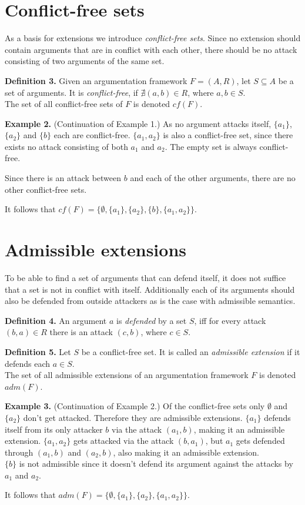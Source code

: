 \documentclass[draft,final]{vutinfth} %
\newcommand{\hl}{\par\vspace{6pt}} %
\newcommand{\cl}{\par\vspace{12pt}} %
\begin{document}
\section{Conflict-free sets}

As a basis for extensions we introduce \emph{conflict-free sets}. Since no extension should contain arguments that are in conflict with each other, there should be no attack consisting of two arguments of the same set.\cl

\textbf{Definition 3.} Given an argumentation framework $F=(A,R)$, let $S\subseteq A$ be a set of arguments. It is \emph{conflict-free}, if $\nexists (a,b)\in R$, where $a,b\in S$.\\
The set of all conflict-free sets of $F$ is denoted $cf(F)$.\cl

\textbf{Example 2.} (Continuation of Example 1.) As no argument attacks itself, $\{a_1\}$, $\{a_2\}$ and $\{b\}$ each are conflict-free. $\{a_1,a_2\}$ is also a conflict-free set, since there exists no attack consisting of both $a_1$ and $a_2$. The empty set is always conflict-free.\hl
Since there is an attack between $b$ and each of the other arguments, there are no other conflict-free sets.\hl
It follows that $cf(F)=\{\emptyset,\{a_1\},\{a_2\},\{b\},\{a_1,a_2\}\}$.\cl

\section{Admissible extensions}

To be able to find a set of arguments that can defend itself, it does not suffice that a set is not in conflict with itself. Additionally each of its arguments should also be defended from outside attackers as is the case with admissible semantics.\hl

\textbf{Definition 4.} An argument $a$ is \emph{defended} by a set $S$, iff for every attack $(b,a)\in R$ there is an attack $(c,b)$, where $c\in S$.\cl

\textbf{Definition 5.} Let $S$ be a conflict-free set. It is called an \emph{admissible extension} if it defends each $a\in S$.\\
The set of all admissible extensions of an argumentation framework $F$ is denoted $adm(F)$.\cl

\textbf{Example 3.} (Continuation of Example 2.) Of the conflict-free sets only \(\emptyset\) and $\{a_2\}$ don't get attacked. Therefore they are admissible extensions. $\{a_1\}$ defends itself from its only attacker $b$ via the attack $(a_1,b)$, making it an admissible extension. $\{a_1,a_2\}$ gets attacked via the attack $(b,a_1)$, but $a_1$ gets defended through $(a_1,b)$ and $(a_2,b)$, also making it an admissible extension.\\
$\{b\}$ is not admissible since it doesn't defend its argument against the attacks by $a_1$ and $a_2$.\hl
It follows that $adm(F)=\{\emptyset,\{a_1\},\{a_2\},\{a_1,a_2\}\}$.\cl
\end{document}
